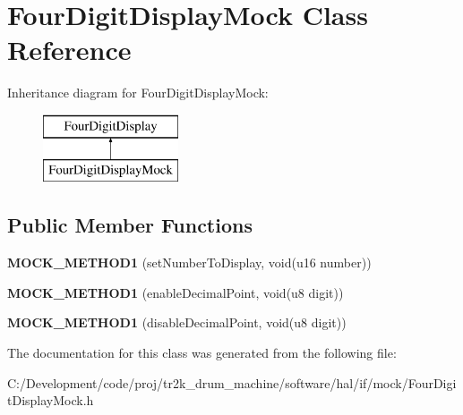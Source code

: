 \hypertarget{class_four_digit_display_mock}{}\section{Four\+Digit\+Display\+Mock Class Reference}
\label{class_four_digit_display_mock}
Inheritance diagram for Four\+Digit\+Display\+Mock\+:\begin{figure}[H]
\begin{center}
\leavevmode
\includegraphics[height=2.000000cm]{class_four_digit_display_mock}
\end{center}
\end{figure}
\subsection*{Public Member Functions}
\begin{DoxyCompactItemize}
\item 
\mbox{\label{class_four_digit_display_mock_ab597d895ae1f604eb0dd0e8d7920c743}} 
{\bfseries M\+O\+C\+K\+\_\+\+M\+E\+T\+H\+O\+D1} (set\+Number\+To\+Display, void(u16 number))
\item 
\mbox{\label{class_four_digit_display_mock_a11fcce7703bbb5d7b13eb4dcbdcb15fe}} 
{\bfseries M\+O\+C\+K\+\_\+\+M\+E\+T\+H\+O\+D1} (enable\+Decimal\+Point, void(u8 digit))
\item 
\mbox{\label{class_four_digit_display_mock_aaa591f57311085358e7a17e22b057b90}} 
{\bfseries M\+O\+C\+K\+\_\+\+M\+E\+T\+H\+O\+D1} (disable\+Decimal\+Point, void(u8 digit))
\end{DoxyCompactItemize}


The documentation for this class was generated from the following file\+:\begin{DoxyCompactItemize}
\item 
C\+:/\+Development/code/proj/tr2k\+\_\+drum\+\_\+machine/software/hal/if/mock/Four\+Digit\+Display\+Mock.\+h\end{DoxyCompactItemize}
